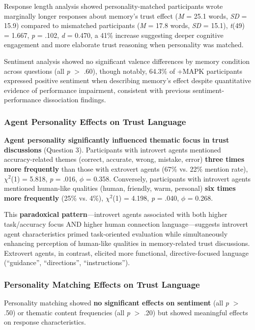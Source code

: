 \documentclass[12pt]{article}
\begin{document}
Response length analysis showed personality-matched participants wrote marginally longer responses about memory's trust effect (\textit{M} = 25.1 words, \textit{SD} = 15.9) compared to mismatched participants (\textit{M} = 17.8 words, \textit{SD} = 15.1), \textit{t}(49) = 1.667, \textit{p} = .102, \textit{d} = 0.470, a 41\% increase suggesting deeper cognitive engagement and more elaborate trust reasoning when personality was matched.

Sentiment analysis showed no significant valence differences by memory condition across questions (all \textit{p} $>$ .60), though notably, 64.3\% of +MAPK participants expressed positive sentiment when describing memory's effect despite quantitative evidence of performance impairment, consistent with previous sentiment-performance dissociation findings.

\subsubsection{Agent Personality Effects on Trust Language}

\textbf{Agent personality significantly influenced thematic focus in trust discussions} (Question 3). Participants with introvert agents mentioned accuracy-related themes (correct, accurate, wrong, mistake, error) \textbf{three times more frequently} than those with extrovert agents (67\% vs. 22\% mention rate), $\chi^2$(1) = 5.818, \textit{p} = .016, $\phi$ = 0.358. Conversely, participants with introvert agents mentioned human-like qualities (human, friendly, warm, personal) \textbf{six times more frequently} (25\% vs. 4\%), $\chi^2$(1) = 4.198, \textit{p} = .040, $\phi$ = 0.268.

This \textbf{paradoxical pattern}---introvert agents associated with both higher task/accuracy focus AND higher human connection language---suggests introvert agent characteristics primed task-oriented evaluation while simultaneously enhancing perception of human-like qualities in memory-related trust discussions. Extrovert agents, in contrast, elicited more functional, directive-focused language (``guidance'', ``directions'', ``instructions'').

\subsubsection{Personality Matching Effects on Trust Language}

Personality matching showed \textbf{no significant effects on sentiment} (all \textit{p} $>$ .50) or thematic content frequencies (all \textit{p} $>$ .20) but showed meaningful effects on response characteristics.
\end{document}
